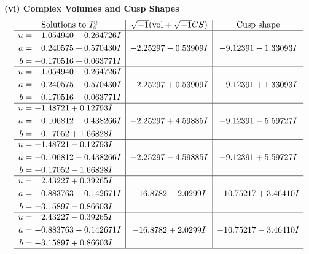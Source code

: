 \documentclass[1p]{elsarticle_modified}
\theoremstyle{definition}
\newcommand{\I}{\sqrt{-1}}
\begin{document}
\newpage\flushleft \textbf{(vi) Complex Volumes and Cusp Shapes}
$$\begin{array}{c|c|c}  
\text{Solutions to }I^u_{4}& \I (\text{vol} + \sqrt{-1}CS) & \text{Cusp shape}\\
 \hline 
\begin{aligned}
u &= \phantom{-}1.054940 + 0.264726 I \\
a &= \phantom{-}0.240575 + 0.570430 I \\
b &= -0.170516 + 0.063771 I\end{aligned}
 & -2.25297 - 0.53909 I & -9.12391 - 1.33093 I \\ \hline\begin{aligned}
u &= \phantom{-}1.054940 - 0.264726 I \\
a &= \phantom{-}0.240575 - 0.570430 I \\
b &= -0.170516 - 0.063771 I\end{aligned}
 & -2.25297 + 0.53909 I & -9.12391 + 1.33093 I \\ \hline\begin{aligned}
u &= -1.48721 + 0.12793 I \\
a &= -0.106812 + 0.438266 I \\
b &= -0.17052 + 1.66828 I\end{aligned}
 & -2.25297 + 4.59885 I & -9.12391 - 5.59727 I \\ \hline\begin{aligned}
u &= -1.48721 - 0.12793 I \\
a &= -0.106812 - 0.438266 I \\
b &= -0.17052 - 1.66828 I\end{aligned}
 & -2.25297 - 4.59885 I & -9.12391 + 5.59727 I \\ \hline\begin{aligned}
u &= \phantom{-}2.43227 + 0.39265 I \\
a &= -0.883763 + 0.142671 I \\
b &= -3.15897 - 0.86603 I\end{aligned}
 & -16.8782 - 2.0299 I & -10.75217 + 3.46410 I \\ \hline\begin{aligned}
u &= \phantom{-}2.43227 - 0.39265 I \\
a &= -0.883763 - 0.142671 I \\
b &= -3.15897 + 0.86603 I\end{aligned}
 & -16.8782 + 2.0299 I & -10.75217 - 3.46410 I\\
 \hline 
 \end{array}$$\newpage\newpage\renewcommand{\arraystretch}{1}
\end{document}
